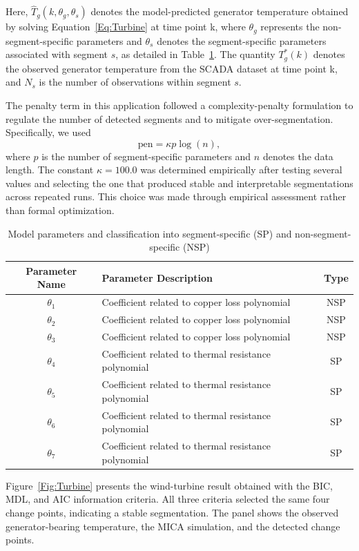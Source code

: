 \documentclass[10pt,letterpaper]{article}
\begin{document}
Here, \(\hat{T}_g(k,\theta_g,\theta_s)\) denotes the model-predicted
generator temperature obtained by solving
Equation~\ref{Eq:Turbine} at time point k, where \(\theta_g\) represents the
non-segment-specific parameters and
\(\theta_s\) denotes the segment-specific parameters associated with
segment \(s\), as detailed in Table~\ref{table:TurbinParameters}.
The quantity \(T_g^*(k)\) denotes the observed generator temperature
from the SCADA dataset at time point k, and \(N_s\) is the number of observations within
segment \(s\).

The penalty term in this application followed a complexity-penalty formulation to regulate the number of detected segments and to mitigate over-segmentation. Specifically, we used
\[
\text{pen} = \kappa  p  \log(n),
\]
where \( p \) is the number of segment-specific parameters and \( n \) denotes the data length. The constant \( \kappa = 100.0 \) was determined empirically after testing several values and selecting the one that produced stable and interpretable segmentations across repeated runs. This choice was made through empirical assessment rather than formal optimization.

\begin{table}[h]
\centering
\begin{tabular}{|c|l|c|}
\hline
\textbf{Parameter Name} & \textbf{Parameter Description} & \textbf{Type} \\ \hline
\(\theta_1\) & Coefficient related to copper loss polynomial  & NSP \\ \hline
\(\theta_2\) & Coefficient related to copper loss polynomial  & NSP \\ \hline
\(\theta_3\) & Coefficient related to copper loss polynomial  & NSP \\ \hline
\(\theta_4\) & Coefficient related to thermal resistance polynomial  & SP \\ \hline
\(\theta_5\) & Coefficient related to thermal resistance polynomial  & SP \\ \hline
\(\theta_6\) & Coefficient related to thermal resistance polynomial  & SP \\ \hline
\(\theta_7\) & Coefficient related to thermal resistance polynomial  & SP \\ \hline
\end{tabular}
\caption{Model parameters and classification into segment-specific (SP) and non-segment-specific (NSP)}
\label{table:TurbinParameters}
\end{table}

Figure~\ref{Fig:Turbine} presents the wind-turbine result obtained with the BIC, MDL, and AIC information criteria. All three criteria selected the same four change points, indicating a stable segmentation. The panel shows the observed generator-bearing temperature, the MICA simulation, and the detected change points.
\end{document}

